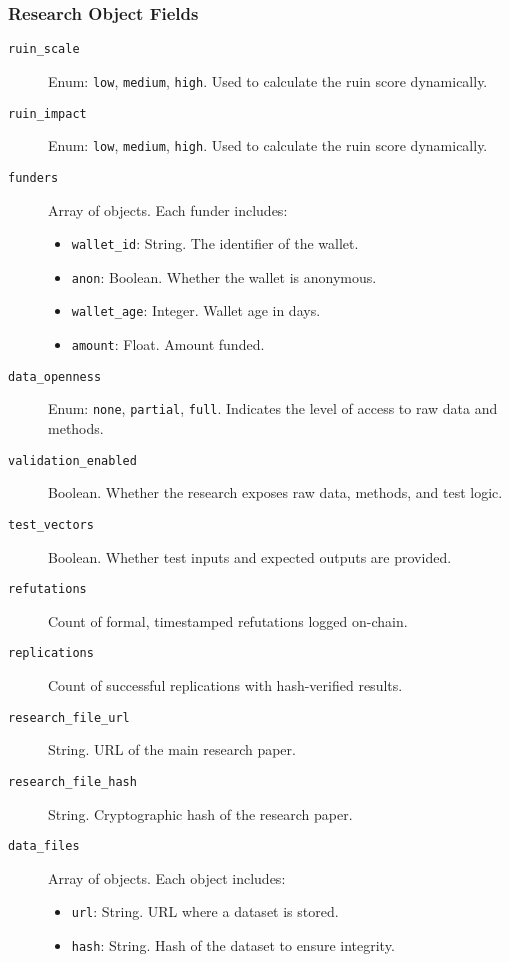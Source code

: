 \subsubsection{Research Object Fields}
\begin{description}
	\item[\texttt{ruin\_scale}] Enum: \texttt{low}, \texttt{medium}, \texttt{high}. Used to calculate the ruin score dynamically.
	\item[\texttt{ruin\_impact}] Enum: \texttt{low}, \texttt{medium}, \texttt{high}. Used to calculate the ruin score dynamically.
	\item[\texttt{funders}] Array of objects. Each funder includes:
	\begin{itemize}
		\item \texttt{wallet\_id}: String. The identifier of the wallet.
		\item \texttt{anon}: Boolean. Whether the wallet is anonymous.
		\item \texttt{wallet\_age}: Integer. Wallet age in days.
		\item \texttt{amount}: Float. Amount funded.
	\end{itemize}
	\item[\texttt{data\_openness}] Enum: \texttt{none}, \texttt{partial}, \texttt{full}. Indicates the level of access to raw data and methods.
	\item[\texttt{validation\_enabled}] Boolean. Whether the research exposes raw data, methods, and test logic.
	\item[\texttt{test\_vectors}] Boolean. Whether test inputs and expected outputs are provided.
	\item[\texttt{refutations}] Count of formal, timestamped refutations logged on-chain.
	\item[\texttt{replications}] Count of successful replications with hash-verified results.
	\item[\texttt{research\_file\_url}] String. URL of the main research paper.
	\item[\texttt{research\_file\_hash}] String. Cryptographic hash of the research paper.
	\item[\texttt{data\_files}] Array of objects. Each object includes:
	\begin{itemize}
		\item \texttt{url}: String. URL where a dataset is stored.
		\item \texttt{hash}: String. Hash of the dataset to ensure integrity.
	\end{itemize}
\end{description}


